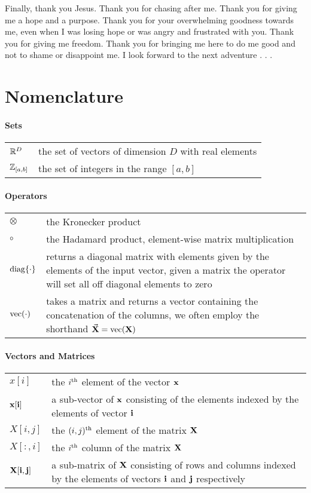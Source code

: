 \documentclass[a4paper,11pt,twoside,openright]{book}
\begin{document}
Finally, thank you Jesus. Thank you for chasing after me. Thank you for giving me a hope and a purpose.  Thank you for your overwhelming goodness towards me, even when I was losing hope or was angry and frustrated with you. Thank you for giving me freedom. Thank you for bringing me here to do me good and not to shame or disappoint me. I look forward to the next adventure . . .







\chapter*{N\lowercase{omenclature}}

\subsubsection{Sets}
\begin{tabular}[]{p{}p{}}
$\mathbb{R}^D$ & the set of vectors of dimension $D$ with real elements \\[0.1cm]
%
$\mathbb{Z}_{[a,b]}$ & the set of integers in the range $[a,b]$
\end{tabular}


\subsubsection{Operators}
\begin{tabular}[]{p{}p{}}
$\otimes$ & the Kronecker product \\[0.1cm]
%
$\circ$ & the Hadamard product, element-wise matrix multiplication \\[0.1cm]
%
$\mathrm{diag}\{\cdot\}$ & returns a diagonal matrix with elements given by the elements of the input vector, given a matrix the operator will set all off diagonal elements to zero \\[0.1cm]
%
$\mathrm{vec}(\cdot)$ & takes a matrix and returns a vector containing the concatenation of the columns, we often employ the shorthand $\vec{\mathbf{X}} = \mathrm{vec}(\mathbf{X})$
\end{tabular}




\subsubsection{Vectors and Matrices}
\begin{tabular}[]{p{}p{}}
$x[i]$ & the $i^{\text{th}}$ element of the vector $\mathbf{x}$ \\[0.1cm]
$\mathbf{x}[\mathbf{i}]$ & a  sub-vector of $\mathbf{x}$ consisting of the elements indexed by the elements of vector $\mathbf{i}$ \\[0.1cm]
$X[i,j]$ & the $(i,j)^{\text{th}}$ element of the matrix $\mathbf{X}$ \\[0.1cm]
$X[:,i]$ & the $i^{\text{th}}$ column of the matrix $\mathbf{X}$ \\[0.1cm]
$\mathbf{X}[\mathbf{i},\mathbf{j}]$ & a sub-matrix of $\mathbf{X}$ consisting of rows and columns indexed by the elements of vectors $\mathbf{i}$ and $\mathbf{j}$ respectively
%
\end{tabular}
\end{document}
